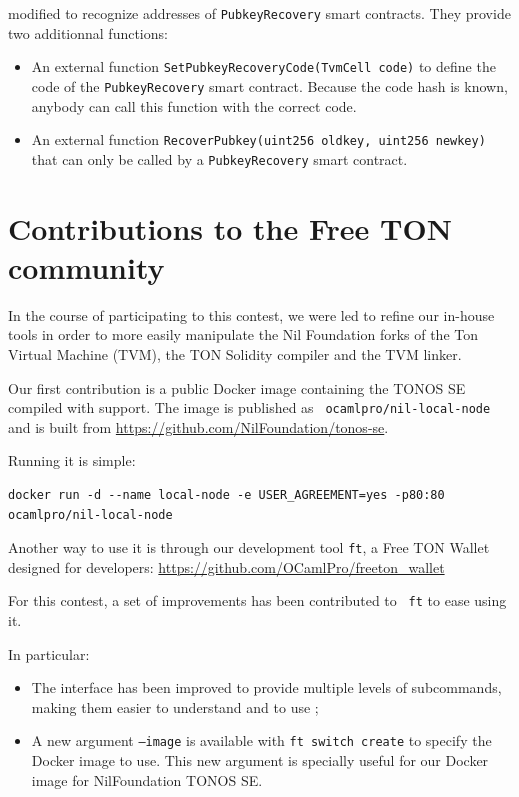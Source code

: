 \documentclass[10pt,a4paper]{article}
\begin{document}
\begin{description}
  modified to recognize addresses of \lstinline{PubkeyRecovery} smart
  contracts. They provide two additionnal functions:
  \begin{itemize}
  \item An external function
    \lstinline{SetPubkeyRecoveryCode(TvmCell code)}
    to define the code of the \lstinline{PubkeyRecovery} smart
    contract. Because the code hash is known, anybody can call this
    function with the correct code.
  \item An external function
    \lstinline{RecoverPubkey(uint256 oldkey, uint256 newkey)}
    that can only be called by a
    \lstinline{PubkeyRecovery} smart contract.
  \end{itemize}
\end{description}


\section{Contributions to the Free TON community}
\label{sec:contributions}

In the course of participating to this contest, we were led to refine
our in-house tools in order to more easily manipulate the Nil
Foundation forks of the Ton Virtual Machine (TVM), the TON Solidity
compiler and the TVM linker.

Our first contribution is a public Docker image containing the TONOS
SE compiled with \zksnarks{} support. The image is published as {\tt
  ocamlpro/nil-local-node} and is built from
\url{https://github.com/NilFoundation/tonos-se}.

Running it is simple:
\begin{verbatim}
docker run -d --name local-node -e USER_AGREEMENT=yes -p80:80 ocamlpro/nil-local-node
\end{verbatim}

Another way to use it is through our development tool {\tt ft}, a Free
TON Wallet designed for developers:
\url{https://github.com/OCamlPro/freeton_wallet}

For this contest, a set of improvements has been contributed to {\tt
  ft} to ease using it.

In particular:
\begin{itemize}
\item The interface has been improved to provide multiple levels of
  subcommands, making them easier to understand and to use ;
\item A new argument {\tt --image} is available with {\tt ft switch
  create} to specify the Docker image to use. This new argument is
  specially useful for our Docker image for NilFoundation TONOS SE.
\end{itemize}
\end{document}
